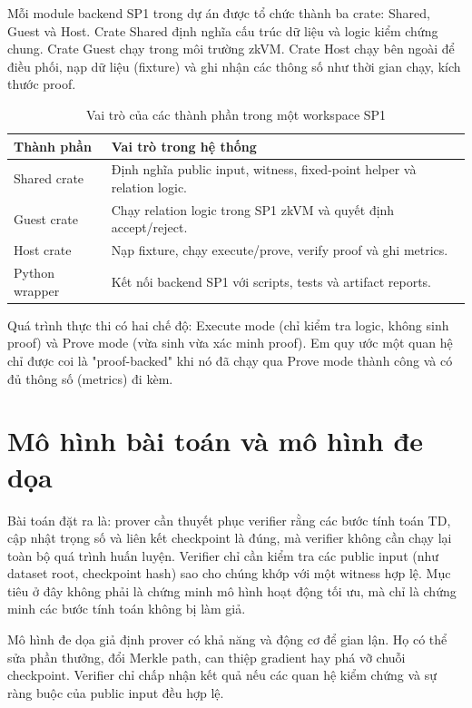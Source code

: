 \documentclass[12pt,a4paper,oneside]{report}
\begin{document}
Mỗi module backend SP1 trong dự án được tổ chức thành ba crate: Shared, Guest và Host. Crate Shared định nghĩa cấu trúc dữ liệu và logic kiểm chứng chung. Crate Guest chạy trong môi trường zkVM. Crate Host chạy bên ngoài để điều phối, nạp dữ liệu (fixture) và ghi nhận các thông số như thời gian chạy, kích thước proof.

\begin{table}[H]
\centering
\caption{Vai trò của các thành phần trong một workspace SP1}
\begin{tabularx}{\textwidth}{p{} p{}}
\toprule
Thành phần & Vai trò trong hệ thống \\
\midrule
Shared crate & Định nghĩa public input, witness, fixed-point helper và relation logic. \\
Guest crate & Chạy relation logic trong SP1 zkVM và quyết định accept/reject. \\
Host crate & Nạp fixture, chạy execute/prove, verify proof và ghi metrics. \\
Python wrapper & Kết nối backend SP1 với scripts, tests và artifact reports. \\
\bottomrule
\end{tabularx}
\end{table}

Quá trình thực thi có hai chế độ: Execute mode (chỉ kiểm tra logic, không sinh proof) và Prove mode (vừa sinh vừa xác minh proof). Em quy ước một quan hệ chỉ được coi là "proof-backed" khi nó đã chạy qua Prove mode thành công và có đủ thông số (metrics) đi kèm.

\section{Mô hình bài toán và mô hình đe dọa}

Bài toán đặt ra là: prover cần thuyết phục verifier rằng các bước tính toán TD, cập nhật trọng số và liên kết checkpoint là đúng, mà verifier không cần chạy lại toàn bộ quá trình huấn luyện. Verifier chỉ cần kiểm tra các public input (như dataset root, checkpoint hash) sao cho chúng khớp với một witness hợp lệ. Mục tiêu ở đây không phải là chứng minh mô hình hoạt động tối ưu, mà chỉ là chứng minh các bước tính toán không bị làm giả.

Mô hình đe dọa giả định prover có khả năng và động cơ để gian lận. Họ có thể sửa phần thưởng, đổi Merkle path, can thiệp gradient hay phá vỡ chuỗi checkpoint. Verifier chỉ chấp nhận kết quả nếu các quan hệ kiểm chứng và sự ràng buộc của public input đều hợp lệ.
\end{document}
